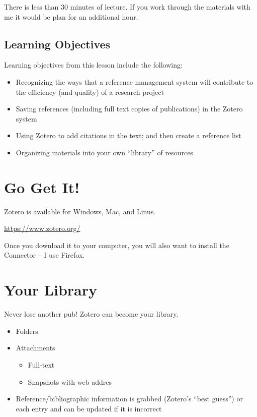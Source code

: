 \documentclass[
  english,
]{book}
\providecommand{\tightlist}{%
  \setlength{\itemsep}{0pt}\setlength{\parskip}{0pt}}
\begin{document}
There is less than 30 minutes of lecture. If you work through the materials with me it would be plan for an additional hour.

\hypertarget{learning-objectives-9}{%
\subsection{Learning Objectives}\label{learning-objectives-9}}

Learning objectives from this lesson include the following:

\begin{itemize}
\tightlist
\item
  Recognizing the ways that a reference management system will contribute to the efficiency (and quality) of a research project
\item
  Saving references (including full text copies of publications) in the Zotero system
\item
  Using Zotero to add citations in the text; and then create a reference list
\item
  Organizing materials into your own ``library'' of resources
\end{itemize}

\hypertarget{go-get-it}{%
\section{Go Get It!}\label{go-get-it}}

Zotero is available for Windows, Mac, and Linus.

\url{https://www.zotero.org/}

Once you download it to your computer, you will also want to install the Connector -- I use Firefox.

\hypertarget{your-library}{%
\section{Your Library}\label{your-library}}

Never lose another pub! Zotero can become your library.

\begin{itemize}
\tightlist
\item
  Folders
\item
  Attachments

  \begin{itemize}
  \tightlist
  \item
    Full-text
  \item
    Snapshots with web addres
  \end{itemize}
\item
  Reference/bibliographic information is grabbed (Zotero's ``best guess'') or each entry and can be updated if it is incorrect
\end{itemize}
\end{document}
